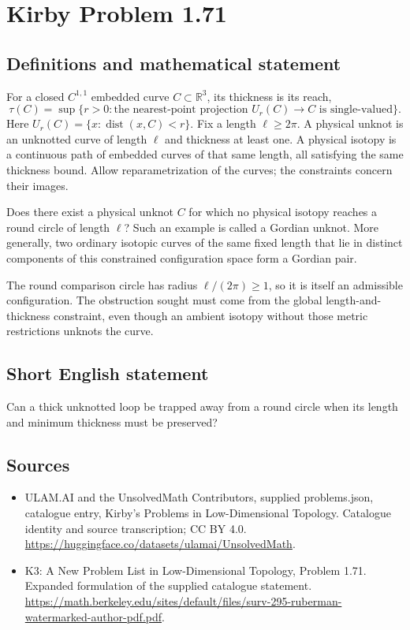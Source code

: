 \documentclass[11pt,a4paper]{article}
\begin{document}
\section*{Kirby Problem 1.71}\label{statement}

\subsection{Definitions and mathematical statement}
For a closed $C^{1,1}$ embedded curve $C\subset\mathbb R^3$, its thickness is
its reach,
\[
\tau(C)=\sup\{r>0:\text{the nearest-point projection }U_r(C)\to C
\text{ is single-valued}\}.
\]
Here $U_r(C)=\{x:\operatorname{dist}(x,C)<r\}$. Fix a length $\ell\geq2\pi$. A physical unknot is an unknotted curve of length
$\ell$ and thickness at least one. A physical isotopy is a continuous path of
embedded curves of that same length, all satisfying the same thickness bound.
Allow reparametrization of the curves; the constraints concern their images.

Does there exist a physical unknot $C$ for which no physical isotopy reaches a
round circle of length $\ell$? Such an example is called a Gordian unknot.
More generally, two ordinary isotopic curves of the same fixed length that lie
in distinct components of this constrained configuration space form a Gordian
pair.

The round comparison circle has radius $\ell/(2\pi)\geq1$, so it is itself an
admissible configuration. The obstruction sought must come from the global
length-and-thickness constraint, even though an ambient isotopy without those
metric restrictions unknots the curve.
\subsection{Short English statement}
Can a thick unknotted loop be trapped away from a round circle when its length and minimum thickness must be preserved?
\subsection{Sources}
\begin{itemize}
\item[S1] ULAM.AI and the UnsolvedMath Contributors, supplied problems.json, catalogue entry, Kirby's Problems in Low-Dimensional Topology. Catalogue identity and source transcription; CC BY 4.0.
\url{https://huggingface.co/datasets/ulamai/UnsolvedMath}.
\item[S2] K3: A New Problem List in Low-Dimensional Topology, Problem 1.71. Expanded formulation of the supplied catalogue statement.
\url{https://math.berkeley.edu/sites/default/files/surv-295-ruberman-watermarked-author-pdf.pdf}.
\end{itemize}
\end{document}
